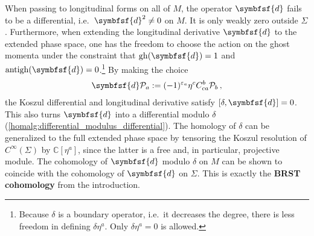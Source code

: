     When passing to longitudinal forms on all of $M$, the operator $\symbfsf{d}$ fails to be a differential, i.e.~$\symbfsf{d}^2\neq0$ on $M$. It is only weakly zero outside $\Sigma$. Furthermore, when extending the longitudinal derivative $\symbfsf{d}$ to the extended phase space, one has the freedom to choose the action on the ghost momenta under the constraint that $\mathrm{gh}(\symbfsf{d})=1$ and $\mathrm{antigh}(\symbfsf{d})=0$.\footnote{Because $\delta$ is a boundary operator, i.e.~it decreases the degree, there is less freedom in defining $\delta\eta^a$. Only $\delta\eta^a=0$ is allowed.} By making the choice
    \begin{gather}
        \symbfsf{d}\mathcal{P}_a := (-1)^{\varepsilon_a}\eta^c C^b_{ca}\mathcal{P}_b\,,
    \end{gather}
    the Koszul differential and longitudinal derivative satisfy $[\delta,\symbfsf{d}]=0$. This also turns $\symbfsf{d}$ into a differential modulo $\delta$ (\cref{homalg:differential_modulus_differential}). The homology of $\delta$ can be generalized to the full extended phase space by tensoring the Koszul resolution of $C^\infty(\Sigma)$ by $\mathbb{C}[\eta^a]$, since the latter is a free and, in particular, projective module. The cohomology of $\symbfsf{d}$ modulo $\delta$ on $M$ can be shown to coincide with the cohomology of $\symbfsf{d}$ on $\Sigma$. This is exactly the \textbf{BRST cohomology} from the introduction.

